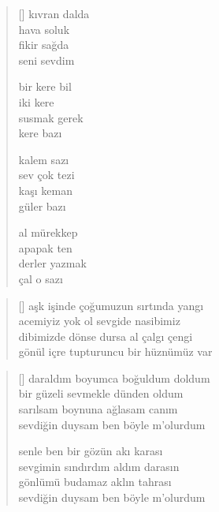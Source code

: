 \documentclass[10pt, openright, twoside]{memoir}
\theoremstyle{definition}
\begin{document}
\vspace*{\fill}
%
\newpage
{}
\vspace*{\fill}
\settowidth{\versewidth}{derler yazmak}
\begin{verse}[\versewidth]
  kıvran dalda \\
  hava soluk \\
  fikir sağda \\
  seni sevdim

  bir kere bil \\
  iki kere \\
  susmak gerek \\
  kere bazı

  kalem sazı \\
  sev çok tezi \\
  kaşı keman \\
  güler bazı

  al mürekkep \\
  apapak ten \\
  derler yazmak \\
  çal o sazı \\
\end{verse}
\vspace*{\fill}
%
\newpage
{}
\vspace*{\fill}
\settowidth{\versewidth}{gönül içre tupturuncu bir hüznümüz var}
\begin{verse}[\versewidth]
  aşk işinde çoğumuzun sırtında yangı \\
  acemiyiz yok ol sevgide nasibimiz \\
  dibimizde dönse dursa al çalgı çengi \\
  gönül içre tupturuncu bir hüznümüz var \\
\end{verse}
\vspace*{\fill}
%
\newpage
{}
\vspace*{\fill}
\settowidth{\versewidth}{sevdiğin duysam ben böyle m'olurdum}
\begin{verse}[\versewidth]
  daraldım boyumca boğuldum doldum \\
  bir güzeli sevmekle dünden oldum \\
  sarılsam boynuna ağlasam canım \\
  sevdiğin duysam ben böyle m'olurdum

  senle ben bir gözün akı karası \\
  sevgimin sındırdım aldım darasın \\
  gönlümü budamaz aklın tahrası \\
  sevdiğin duysam ben böyle m'olurdum \\
\end{verse}
\end{document}

